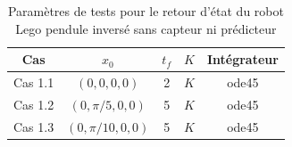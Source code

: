 \documentclass[a4paper]{article}
\begin{document}
                        \begin{table}[h!]
                                \centering
                                \begin{tabular}{|c||c|c|c|c|} \hline
                                        \textbf{Cas} & \textbf{$x_0$} & \textbf{$t_f$} & \textbf{$K$} & \textbf{Intégrateur} \\ \hline
                                        Cas 1.1 & $(0,0,0,0)$ & 2 & $K$ & ode45 \\ \hline
                                        Cas 1.2 & $(0,\pi/5,0,0)$ & 5 & $K$ & ode45 \\ \hline
                                        Cas 1.3 & $(0,\pi/10,0,0)$ & 5 & $K$ & ode45 \\ \hline
                                \end{tabular}
                                \label{table3}
                                \caption{Paramètres de tests pour le retour d'état du robot Lego pendule inversé sans capteur ni prédicteur}
                        \end{table}
\end{document}
